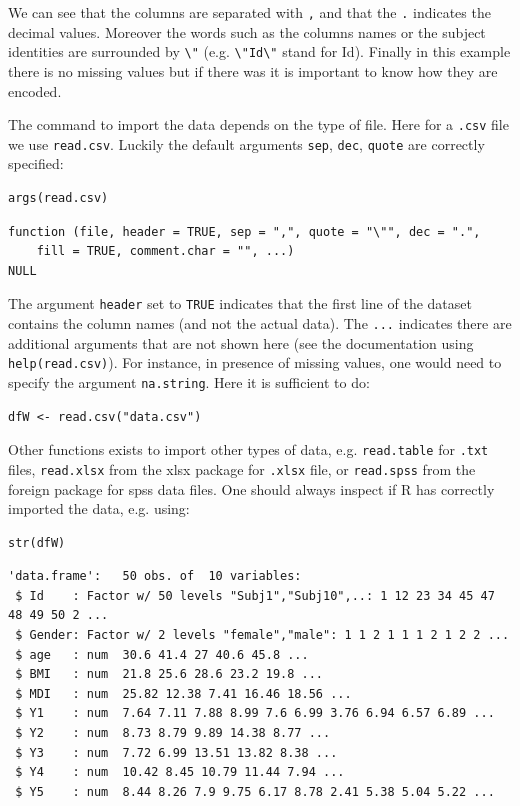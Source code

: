 \documentclass{article}
\begin{document}
We can see that the columns are separated with \texttt{,} and that the \texttt{.}
indicates the decimal values. Moreover the words such as the columns
names or the subject identities are surrounded by \texttt{\textbackslash{}"} (e.g. \texttt{\textbackslash{}"Id\textbackslash{}"}
stand for Id). Finally in this example there is no missing values but
if there was it is important to know how they are encoded.

\clearpage

 The command to import the data depends on the type of file. Here for
a \texttt{.csv} file we use \texttt{read.csv}. Luckily the default arguments \texttt{sep},
\texttt{dec}, \texttt{quote} are correctly specified:
\lstset{language=r,label= ,caption= ,captionpos=b,numbers=none}
\begin{lstlisting}
args(read.csv)
\end{lstlisting}

\begin{verbatim}
function (file, header = TRUE, sep = ",", quote = "\"", dec = ".", 
    fill = TRUE, comment.char = "", ...) 
NULL
\end{verbatim}

The argument \texttt{header} set to \texttt{TRUE} indicates that the first line of
the dataset contains the column names (and not the actual data). The
\texttt{...} indicates there are additional arguments that are not shown here
(see the documentation using \texttt{help(read.csv)}). For instance, in
presence of missing values, one would need to specify the argument
\texttt{na.string}. Here it is sufficient to do:
\lstset{language=r,label= ,caption= ,captionpos=b,numbers=none}
\begin{lstlisting}
dfW <- read.csv("data.csv")
\end{lstlisting}

Other functions exists to import other types of data,
e.g. \texttt{read.table} for \texttt{.txt} files, \texttt{read.xlsx} from the xlsx package
for \texttt{.xlsx} file, or \texttt{read.spss} from the foreign package for spss
data files. One should always inspect if R has correctly imported the
data, e.g. using:
\lstset{language=r,label= ,caption= ,captionpos=b,numbers=none}
\begin{lstlisting}
str(dfW)
\end{lstlisting}

\begin{verbatim}
'data.frame':	50 obs. of  10 variables:
 $ Id    : Factor w/ 50 levels "Subj1","Subj10",..: 1 12 23 34 45 47 48 49 50 2 ...
 $ Gender: Factor w/ 2 levels "female","male": 1 1 2 1 1 1 2 1 2 2 ...
 $ age   : num  30.6 41.4 27 40.6 45.8 ...
 $ BMI   : num  21.8 25.6 28.6 23.2 19.8 ...
 $ MDI   : num  25.82 12.38 7.41 16.46 18.56 ...
 $ Y1    : num  7.64 7.11 7.88 8.99 7.6 6.99 3.76 6.94 6.57 6.89 ...
 $ Y2    : num  8.73 8.79 9.89 14.38 8.77 ...
 $ Y3    : num  7.72 6.99 13.51 13.82 8.38 ...
 $ Y4    : num  10.42 8.45 10.79 11.44 7.94 ...
 $ Y5    : num  8.44 8.26 7.9 9.75 6.17 8.78 2.41 5.38 5.04 5.22 ...
\end{verbatim}
\end{document}
